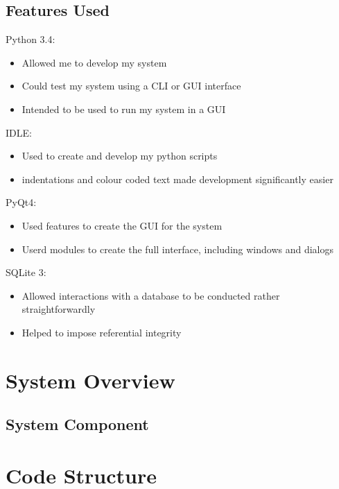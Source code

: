 \subsection{Features Used}



Python 3.4:
\begin{itemize}
    \item Allowed me to develop my system
    \item Could test my system using a CLI or GUI interface
    \item Intended to be used to run my system in a GUI
\end{itemize}

IDLE:
\begin{itemize}    
    \item Used to create and develop my python scripts
    \item indentations and colour coded text made development significantly easier
\end{itemize}

PyQt4:
\begin{itemize}
    \item Used features to create the GUI for the system
    \item Userd modules to create the full interface, including windows and dialogs
\end{itemize}

SQLite 3:
\begin{itemize}
    \item Allowed interactions with a database to be conducted rather straightforwardly
    \item Helped to impose referential integrity
\end{itemize}


\section{System Overview}
 
\subsection{System Component}



\section{Code Structure}

